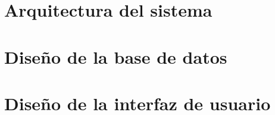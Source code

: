 \section{Arquitectura del sistema}
\label{arquitectura_sistema}



\section{Diseño de la base de datos}
\label{diseno_base_datos}

\section{Diseño de la interfaz de usuario}
\label{diseno_interfaz_usuario}